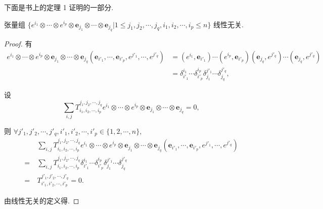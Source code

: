 \documentclass{ctexart}
\begin{document}
下面是书上的定理 1 证明的一部分.
\begin{theorem}\label{t1.1}
    张量组 $\{e^{i_1}\otimes\cdots\otimes e^{i_p}\otimes\boldsymbol{e}_{j_1}\otimes\cdots\otimes\boldsymbol{e}_{j_q}|1\leq j_1,j_2,\cdots,j_q,i_1,i_2,\cdots,i_p\leq n\}$ 线性无关.
\end{theorem}
\begin{proof}
    有
    \begin{align*}
        e^{i_1}\otimes\cdots\otimes e^{i_p}\otimes\boldsymbol{e}_{j_1}\otimes\cdots\otimes\boldsymbol{e}_{j_q}(\boldsymbol{e}_{i'_1},\cdots,\boldsymbol{e}_{i'_p},e^{j'_1},\cdots,e^{j'_q}) & =(e^{i_1},\boldsymbol{e}_{i'_1})\cdots(e^{i_p},\boldsymbol{e}_{i'_p})(\boldsymbol{e}_{j_q},e^{j'_q})\cdots(\boldsymbol{e}_{j_q},e^{j'_q}) \\
        & =\delta_{i'_1}^{i_1}\cdots\delta_{i'_p}^{i_p}\delta_{j_1}^{j'_1}\cdots\delta_{j_q}^{j'_q},
    \end{align*}

    设
    \[\sum\limits_{i,j}T^{j_1,j_2,\cdots,j_q}_{i_1,i_2,\cdots,i_p}e^{i_1}\otimes\cdots\otimes e^{i_p}\otimes\boldsymbol{e}_{j_1}\otimes\cdots\otimes\boldsymbol{e}_{j_q}=0,\]

    则 $\forall j'_1,j'_2,\cdots,j'_q,i'_1,i'_2,\cdots,i'_p\in\{1,2,\cdots,n\}$,
    \begin{align*}
        & \sum\limits_{i,j}T^{j_1,j_2,\cdots,j_q}_{i_1,i_2,\cdots,i_p}e^{i_1}\otimes\cdots\otimes e^{i_p}\otimes\boldsymbol{e}_{j_1}\otimes\cdots\otimes\boldsymbol{e}_{j_q}(\boldsymbol{e}_{i'_1},\cdots,\boldsymbol{e}_{i'_p},e^{j'_1},\cdots,e^{j'_q}) \\
        =\ & \sum\limits_{i,j}T^{j_1,j_2,\cdots,j_q}_{i_1,i_2,\cdots,i_p}\delta_{i'_1}^{i_1}\cdots\delta_{i'_p}^{i_p}\delta_{j_1}^{j'_1}\cdots\delta_{j_q}^{j'_q} \\
        =\ & T^{j'_1,j'_2,\cdots,j'_q}_{i'_1,i'_2,\cdots,i'_p}=0.
    \end{align*}

    由线性无关的定义得.
\end{proof}
\end{document}
